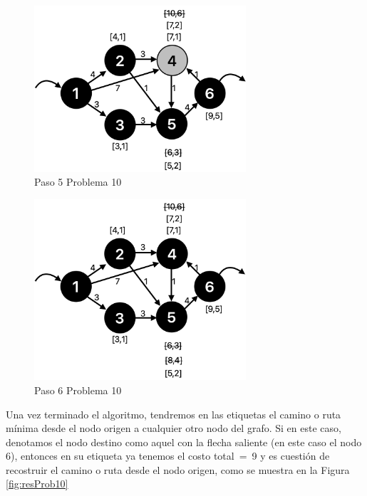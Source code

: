 \documentclass[12pt]{article}  %
\begin{document}
\begin{figure}[H]
\centering
\caption{Paso 5 Problema 10}
\label{fig:paso5Prob10}
\includegraphics[width=0.7\textwidth]{assets/paso5Prob10.png}
\end{figure}

\begin{figure}[H]
\centering
\caption{Paso 6 Problema 10}
\label{fig:paso6Prob10}
\includegraphics[width=0.7\textwidth]{assets/paso6Prob10.png}
\end{figure}

Una vez terminado el algoritmo, tendremos en las etiquetas el camino o ruta mínima desde el nodo origen a cualquier otro nodo del grafo. Si en este caso, denotamos el nodo destino como aquel con la flecha saliente (en este caso el nodo 6), entonces en su etiqueta ya tenemos el costo \mbox{total = 9} y es cuestión de recostruir el camino o ruta desde el nodo origen, como se muestra en la Figura \ref{fig:resProb10}
\end{document}
